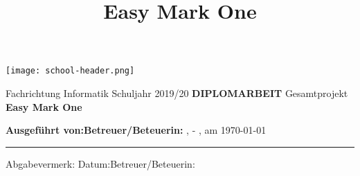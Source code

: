 \documentclass[12pt,a4paper,oneside]{report}
\title{Easy Mark One}
\author{\IfPrivateBuild{\EmRealAuthorName}{T0astBread}}
\newcommand{\IfPrivateBuild}[2]{#1}
\newcommand{\IfPrivateBuild}[2]{#2}
\begin{document}
	\IfPrivateBuild{
		\texttt{[image: school-header.png]}
		{\centering
			\vskip1cm
			Fachrichtung Informatik
			\vskip2cm
			Schuljahr 2019/20
			\vskip4cm
			\Huge\textbf{DIPLOMARBEIT}
			\vskip10pt
			\large
			Gesamtprojekt
			\vskip5pt
			\Huge\textbf{Easy Mark One}
			\small
			\vskip4cm
			\begin{flushleft}
				\textbf{Ausgeführt von:}\tabto{10cm}\textbf{Betreuer/Beteuerin:}\linebreak
				\EmRealAuthorName, \EmAuthorClass-\EmAuthorNumber
				\vskip2cm
				\EmPhysicalLocation, am \today
				\vskip1cm
				\hrule
				Abgabevermerk:\linebreak
				Datum:\tabto{10cm}Betreuer/Beteuerin:
			\end{flushleft}
		}
	}{
		\maketitle
		\pagebreak
	}
\end{document}
